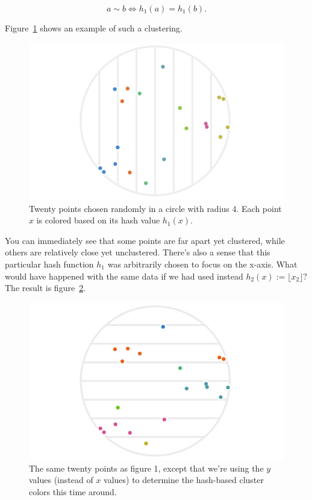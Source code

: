 \documentclass[20pt,]{extarticle}
\begin{document}
\[ a \sim b \iff h_1(a) = h_1(b). \]

Figure~\ref{fig:fig1} shows an example of such a clustering.

\begin{figure}
\centering
\includegraphics{images/lsh_image1_v2.png}
\caption{Twenty points chosen randomly in a circle with radius 4. Each
point \(x\) is colored based on its hash value
\(h_1(x).\)}\label{fig:fig1}
\end{figure}

You can immediately see that some points are far apart yet clustered,
while others are relatively close yet unclustered. There's also a sense
that this particular hash function \(h_1\) was arbitrarily chosen to
focus on the x-axis. What would have happened with the same data if we
had used instead \(h_2(x) := \lfloor x_2 \rfloor?\) The result is
figure~\ref{fig:fig2}.

\begin{figure}
\centering
\includegraphics{images/lsh_image2.png}
\caption{The same twenty points as figure 1, except that we're using the
\(y\) values (instead of \(x\) values) to determine the hash-based
cluster colors this time around.}\label{fig:fig2}
\end{figure}
\end{document}
